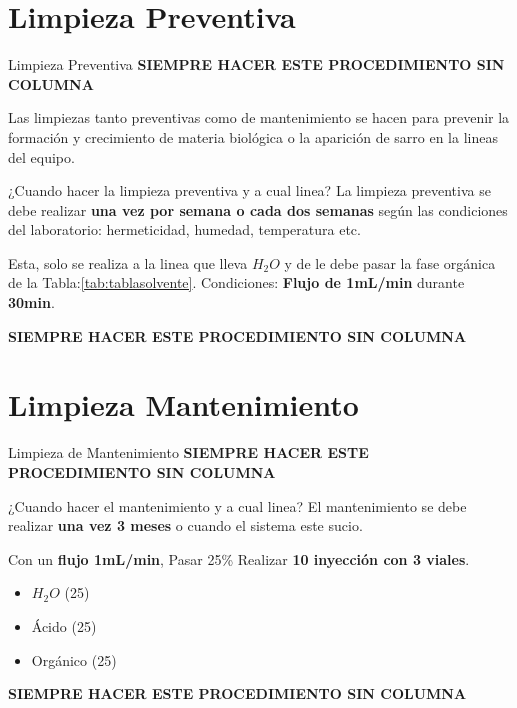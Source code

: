 \documentclass[11pt]{beamer}
\begin{document}
    \section{Limpieza Preventiva}


      \begin{frame}{Limpieza Preventiva}
         \textbf{{\Large }SIEMPRE HACER ESTE PROCEDIMIENTO SIN COLUMNA}

         Las limpiezas tanto preventivas como de mantenimiento se hacen para prevenir la formación y crecimiento de materia biológica o la aparición de sarro en la lineas del equipo.
         \begin{block}{¿Cuando hacer la limpieza preventiva y a cual linea?}
             La limpieza preventiva se debe realizar\textbf{ una vez por semana o cada dos semanas} según las condiciones del laboratorio: hermeticidad, humedad, temperatura etc.

             Esta, solo se realiza a la linea que lleva $H_2O$ y de le debe pasar la fase orgánica de la Tabla:\ref{tab:tablasolvente}.
             Condiciones: \textbf{Flujo de 1mL/min} durante \textbf{30min}.
         \end{block}
         \textbf{{\Large }SIEMPRE HACER ESTE PROCEDIMIENTO SIN COLUMNA}
      \end{frame}

    \section{Limpieza Mantenimiento}
      \begin{frame}{Limpieza de Mantenimiento}
        \textbf{{\Large }SIEMPRE HACER ESTE PROCEDIMIENTO SIN COLUMNA}

        \begin{block}{¿Cuando hacer el mantenimiento y a cual linea?}
          El mantenimiento se debe realizar \textbf{una vez 3 meses} o cuando el sistema este sucio.

          Con un \textbf{flujo 1mL/min},   Pasar 25\% Realizar \textbf{10 inyección con 3 viales}.
          \begin{itemize}
              \item $H_2O$ (25)
              \item Ácido (25)
              \item Orgánico (25)
          \end{itemize}

       \end{block}

       \textbf{{\Large }SIEMPRE HACER ESTE PROCEDIMIENTO SIN COLUMNA}
      \end{frame}
\end{document}
